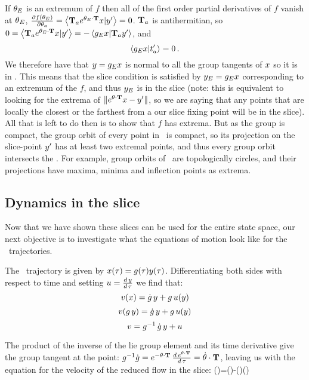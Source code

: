 {If ${\bf \theta}_E$ is an extremum of $f$ then all of the first order partial derivatives of $f$ vanish at ${\bf \theta}_E$, $\frac{\partial f({\bf \theta}_E)}{\partial {\bf \theta}_a} =\left\langle {\ensuremath{\mathbf{T}}_a e^{\ensuremath{{\bf \theta}}_E \cdot \ensuremath{\mathbf{T}}} \ensuremath{x}}|{{y'}} \right\rangle=0$. $\mathbf{T}_a$ is antihermitian, so
$0=\left\langle {\ensuremath{\mathbf{T}}_a e^{\ensuremath{{\bf \theta}}_E \cdot \ensuremath{\mathbf{T}}}\ensuremath{x}}|{{y'}} \right\rangle
= - \left\langle {\ensuremath{g}_E \ensuremath{x}}|{\mathbf{T}_a  {y'}} \right\rangle$,
and
\[
\left\langle {\ensuremath{g}_E \ensuremath{x}}|{t'_{a}} \right\rangle =0
\,.
\]
We therefore have that $y= g_E x$ is normal to all the group tangents of $x$ so it is in \pSRed. This means that the slice condition is satisfied by $y_E = g_E x$ corresponding to an extremum of the $f$, and thus $y_E$ is in the slice (note: this is equivalent to looking for the extrema of $\|e^{{\bf \theta} \cdot \mathbf{T}}x - {y'}\|$, so we are saying that any points that are locally the closest or the farthest from a our slice fixing point will be in the slice). All that is left to do then is to show that $f$ has extrema. But as the group is compact, the group orbit of every point in \pS\ is compact, so its projection on the slice-point ${y'}$ has at least two extremal points, and thus every group orbit intersects the \slice. For example, group orbits of \ are topologically circles, and their projections have maxima, minima and inflection points as extrema.


\subsection{Dynamics in the slice}
\label{sect:MovFrameODE}

Now that we have shown these slices can be used for the entire state space, our next objective is to investigate
what the equations of motion look like for the \reducedsp\ trajectories.

The \reducedsp\ trajectory is given by $x(\tau)=g(\tau) y(\tau)$. Differentiating both sides with respect to time and setting $u=\frac{d \, y}{d \, \tau}$ we find that:
\[
v(x)=\dot{g} \, y+g \, u(y) \]
\[
v(g \, y)=\dot{g} \, y+g \, u(y) \]
\[
v=g^{-1} \, \dot{g} \, y+ u \]

The product of the inverse of the lie group element and its time derivative give the group tangent at the point: $g^{-1}\dot{g}=e^{-{\bf \theta} \cdot \mathbf{T}} \,
\frac{d \, e^{{\bf \theta} \cdot \mathbf{T}}}{d \, \tau}=\dot{{\bf \theta}}\cdot \mathbf{T}$, leaving us with the equation for the velocity of the reduced flow in the slice:
\beq
\velRed(\sspRed)=\velRed(\sspRed)-\gSpace(\sspRed)\cdot \groupTan(\sspRed)

}

